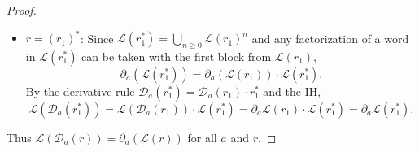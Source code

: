 \begin{proof}[Proof]
\begin{itemize}
\[\begin{aligned}
\end{aligned}
\]
By definition of $\nu$,
\[
\mathcal{L}\big(\nu(r_1)\big)=
\begin{cases}
\{\varepsilon\} & \text{if }\varepsilon\in\mathcal{L}(r_1),\\
\emptyset       & \text{otherwise,}
\end{cases}
\]
hence
\[
\mathcal{L}\big(\mathcal{D}_a(r_1\cdot r_2)\big)
=
\partial_a(\mathcal{L}(r_1))\cdot \mathcal{L}(r_2)
\;\cup\;
\begin{cases}
\partial_a(\mathcal{L}(r_2)) & \text{if }\varepsilon\in\mathcal{L}(r_1),\\
\emptyset                   & \text{otherwise.}
\end{cases}
\]
This is exactly the left-quotient law for concatenation,
\[
\partial_a\!\big(\mathcal{L}(r_1)\cdot \mathcal{L}(r_2)\big)
=
\partial_a(\mathcal{L}(r_1))\cdot \mathcal{L}(r_2)
\;\cup\;
\big(\,\varepsilon\in\mathcal{L}(r_1)\;?\;\partial_a\mathcal{L}(r_2):\emptyset\,\big),
\]
so
\[
\mathcal{L}\big(\mathcal{D}_a(r_1\cdot r_2)\big)
=
\partial_a\!\big(\mathcal{L}(r_1)\cdot \mathcal{L}(r_2)\big)
=
\partial_a\big(\mathcal{L}(r_1\cdot r_2)\big).
\]

  \item $r=(r_1)^*$:
    Since $\mathcal{L}(r_1^*) = \bigcup_{n\ge 0} \mathcal{L}(r_1)^n$ and any factorization of a word
    in $\mathcal{L}(r_1^*)$ can be taken with the first block from $\mathcal{L}(r_1)$,
    \[
      \partial_a (\mathcal{L}(r_1^*)) = \partial_a (\mathcal{L}(r_1)) \cdot \mathcal{L}(r_1^*).
    \]
    By the derivative rule $\mathcal{D}_a(r_1^*)=\mathcal{D}_a(r_1)\cdot r_1^*$ and the IH,
    \[
      \mathcal{L}(\mathcal{D}_a(r_1^*)) = \mathcal{L}(\mathcal{D}_a(r_1))\cdot \mathcal{L}(r_1^*)
      = \partial_a \mathcal{L}(r_1)\cdot \mathcal{L}(r_1^*)
      = \partial_a \mathcal{L}(r_1^*).
    \]
\end{itemize}
Thus $\mathcal{L}(\mathcal{D}_a(r))=\partial_a (\mathcal{L}(r))$ for all $a$ and $r$.


\end{proof}
